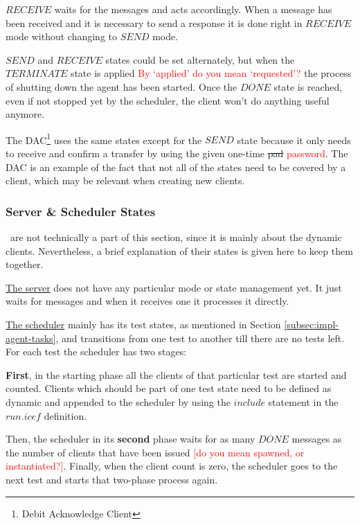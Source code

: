 $RECEIVE$ waits for the messages and acts accordingly. When a message has been received and it is necessary to send a response it is done right in $RECEIVE$ mode without changing to $SEND$ mode.

$SEND$ and $RECEIVE$ states could be set alternately, but when the $TERMINATE$ state is applied \textcolor{red}{By `applied' do you mean `requested'?} the process of shutting down the agent has been started. Once the $DONE$ state is reached, even if not stopped yet by the scheduler, the client won't do anything useful anymore.

The DAC\footnote{Debit Acknowledge Client} uses the same states except for the $SEND$ state because it only needs to receive and confirm a transfer by using the given one-time \st{pad} \textcolor{red}{password}. The DAC is an example of the fact that not all of the states need to be covered by a client, which may be relevant when creating new clients.

\subsubsection{Server \& Scheduler States}\ are not technically a part of this section, since it is mainly about the dynamic clients. Nevertheless, a brief explanation of their states is given here to keep them together.

\underline{The server} does not have any particular mode or state management yet. It just waits for messages and when it receives one it processes it directly.

\underline{The scheduler} mainly has its test states, as mentioned in Section \ref{subsec:impl-agent-tasks}, and transitions from one test to another till there are no tests left. For each test the scheduler has two stages:
\begin{packed_item1}
\small
\item \textbf{First}, in the starting phase all the clients of that particular test are started and counted. Clients which should be part of one test state need to be defined as dynamic and appended to the scheduler by using the $include$ statement in the $run.icef$ definition.
\item Then, the scheduler in its \textbf{second} phase waits for as many $DONE$ messages as the number of clients that have been issued \textcolor{red}{[do you mean spawned, or instantiated?]}. Finally, when the client count is zero, the scheduler goes to the next test and starts that two-phase process again.
\end{packed_item1}


